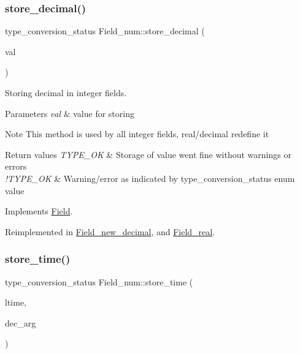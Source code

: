\subsubsection{\texorpdfstring{store\+\_\+decimal()}{store\_decimal()}}
{\footnotesize\ttfamily type\+\_\+conversion\+\_\+status Field\+\_\+num\+::store\+\_\+decimal (\begin{DoxyParamCaption}\item[{const \mbox{\hyperlink{classmy__decimal}{my\+\_\+decimal}} $\ast$}]{val }\end{DoxyParamCaption})\hspace{0.3cm}{\ttfamily [virtual]}}

Storing decimal in integer fields.


\begin{DoxyParams}{Parameters}
{\em val} & value for storing\\
\hline
\end{DoxyParams}
\begin{DoxyNote}{Note}
This method is used by all integer fields, real/decimal redefine it
\end{DoxyNote}

\begin{DoxyRetVals}{Return values}
{\em T\+Y\+P\+E\+\_\+\+OK} & Storage of value went fine without warnings or errors \\
\hline
{\em !\+T\+Y\+P\+E\+\_\+\+OK} & Warning/error as indicated by type\+\_\+conversion\+\_\+status enum value \\
\hline
\end{DoxyRetVals}


Implements \mbox{\hyperlink{classField}{Field}}.



Reimplemented in \mbox{\hyperlink{classField__new__decimal_a15580620890eb78ffde70b2f54ad684f}{Field\+\_\+new\+\_\+decimal}}, and \mbox{\hyperlink{classField__real_ae06ebf885e6b10b0a7c4966873d6b80f}{Field\+\_\+real}}.

\mbox{\label{classField__num_ab573b6e30982c3d517794503f14560de}} 
\subsubsection{\texorpdfstring{store\+\_\+time()}{store\_time()}}
{\footnotesize\ttfamily type\+\_\+conversion\+\_\+status Field\+\_\+num\+::store\+\_\+time (\begin{DoxyParamCaption}\item[{M\+Y\+S\+Q\+L\+\_\+\+T\+I\+ME $\ast$}]{ltime,  }\item[{uint8}]{dec\+\_\+arg }\end{DoxyParamCaption})\hspace{0.3cm}{\ttfamily [virtual]}}

